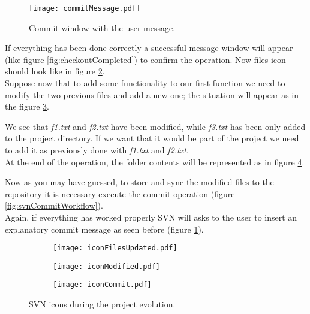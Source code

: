 \begin{figure}[ht!]
    \centering
    \texttt{[image: commitMessage.pdf]}
    \caption{Commit window with the user message.}
    \label{fig:commitMessage}
\end{figure}


If everything has been done correctly a successful message window will appear (like figure \ref{fig:checkoutCompleted}) to confirm the operation. Now files icon should look like in figure \ref{fig:iconFilesUpdated}.\\

Suppose now that to add some functionality to our first function we need to modify the two previous files and add a new one; the situation will appear as in the figure \ref{fig:iconModified}.

We see that \textit{f1.txt} and \textit{f2.txt} have been modified, while \textit{f3.txt} has been only added to the project directory. If we want that it would be part of the project we need to add it as previously done with \textit{f1.txt} and \textit{f2.txt}.\\

At the end of the operation, the folder contents will be represented as in figure \ref{fig:iconCommit}.

Now as you may have guessed, to store and sync the modified files to the repository it is necessary execute the commit operation (figure \ref{fig:svnCommitWorkflow}).\\

Again, if everything has worked properly SVN will asks to the user to insert an explanatory commit message as seen before (figure \ref{fig:commitMessage}).

\begin{figure}[htbp]
\begin{subfigure}{0.33\textwidth}
  \centering
  \texttt{[image: iconFilesUpdated.pdf]}
  \caption{} %
  \label{fig:iconFilesUpdated}
\end{subfigure}%
\begin{subfigure}{0.33\textwidth}
  \centering
  \texttt{[image: iconModified.pdf]}
  \caption{}%
  \label{fig:iconModified}
\end{subfigure}
\begin{subfigure}{0.33\textwidth}
  \centering
  \texttt{[image: iconCommit.pdf]}
  \caption{}%
  \label{fig:iconCommit}
\end{subfigure}
\caption{SVN icons during the project evolution.}
\label{fig:systemIcons_3}
\end{figure}

